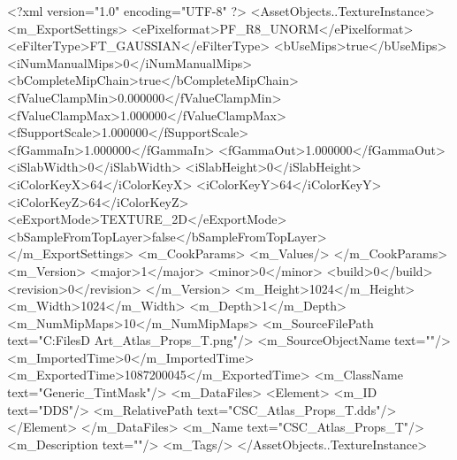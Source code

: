 <?xml version="1.0" encoding="UTF-8" ?>
<AssetObjects..TextureInstance>
	<m_ExportSettings>
		<ePixelformat>PF_R8_UNORM</ePixelformat>
		<eFilterType>FT_GAUSSIAN</eFilterType>
		<bUseMips>true</bUseMips>
		<iNumManualMips>0</iNumManualMips>
		<bCompleteMipChain>true</bCompleteMipChain>
		<fValueClampMin>0.000000</fValueClampMin>
		<fValueClampMax>1.000000</fValueClampMax>
		<fSupportScale>1.000000</fSupportScale>
		<fGammaIn>1.000000</fGammaIn>
		<fGammaOut>1.000000</fGammaOut>
		<iSlabWidth>0</iSlabWidth>
		<iSlabHeight>0</iSlabHeight>
		<iColorKeyX>64</iColorKeyX>
		<iColorKeyY>64</iColorKeyY>
		<iColorKeyZ>64</iColorKeyZ>
		<eExportMode>TEXTURE_2D</eExportMode>
		<bSampleFromTopLayer>false</bSampleFromTopLayer>
	</m_ExportSettings>
	<m_CookParams>
		<m_Values/>
	</m_CookParams>
	<m_Version>
		<major>1</major>
		<minor>0</minor>
		<build>0</build>
		<revision>0</revision>
	</m_Version>
	<m_Height>1024</m_Height>
	<m_Width>1024</m_Width>
	<m_Depth>1</m_Depth>
	<m_NumMipMaps>10</m_NumMipMaps>
	<m_SourceFilePath text="C:\Users\Shadow\Desktop\Working Files\3D Art\Textures\CSC_Atlas_Props_T.png"/>
	<m_SourceObjectName text=""/>
	<m_ImportedTime>0</m_ImportedTime>
	<m_ExportedTime>1087200045</m_ExportedTime>
	<m_ClassName text="Generic_TintMask"/>
	<m_DataFiles>
		<Element>
			<m_ID text="DDS"/>
			<m_RelativePath text="CSC_Atlas_Props_T.dds"/>
		</Element>
	</m_DataFiles>
	<m_Name text="CSC_Atlas_Props_T"/>
	<m_Description text=""/>
	<m_Tags/>
</AssetObjects..TextureInstance>

